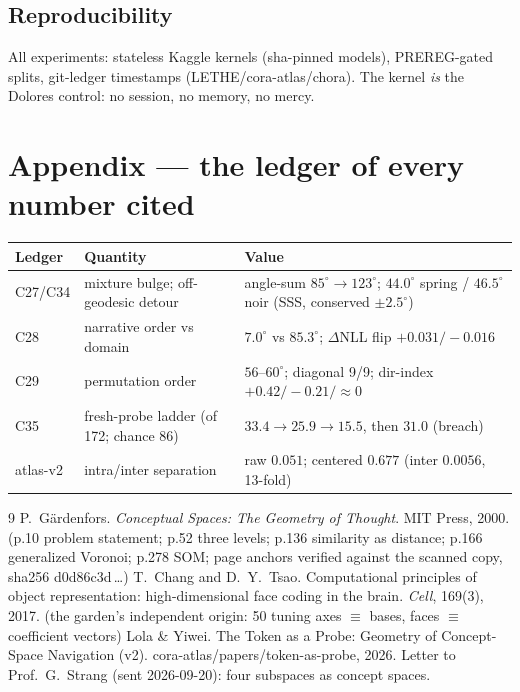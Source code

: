 \documentclass[11pt]{article}
\begin{document}
\subsection*{Reproducibility}
All experiments: stateless Kaggle kernels (sha-pinned models), PREREG-gated
splits, git-ledger timestamps (LETHE/cora-atlas/chora). The kernel \emph{is} the
Dolores control: no session, no memory, no mercy.

\section*{Appendix --- the ledger of every number cited}
\begin{tabular}{llp{7.2cm}}
\toprule
Ledger & Quantity & Value\\
\midrule
C27/C34 & mixture bulge; off-geodesic detour & angle-sum $85^\circ\!\to\!123^\circ$; $44.0^\circ$ spring / $46.5^\circ$ noir (SSS, conserved $\pm2.5^\circ$)\\
C28 & narrative order vs domain & $7.0^\circ$ vs $85.3^\circ$; $\Delta$NLL flip $+0.031/-0.016$\\
C29 & permutation order & $56$--$60^\circ$; diagonal 9/9; dir-index $+0.42/-0.21/\approx0$\\
C35 & fresh-probe ladder (of 172; chance 86) & $33.4\to25.9\to15.5$, then $31.0$ (breach)\\
atlas-v2 & intra/inter separation & raw $0.051$; centered $0.677$ (inter $0.0056$, 13-fold)\\
\bottomrule
\end{tabular}


\begin{thebibliography}{9}
 P.~G\"ardenfors. \emph{Conceptual Spaces: The Geometry of Thought}. MIT Press, 2000. (p.10 problem statement; p.52 three levels; p.136 similarity as distance; p.166 generalized Voronoi; p.278 SOM; page anchors verified against the scanned copy, sha256 d0d86c3d\,\dots)
 T.~Chang and D.~Y.~Tsao. Computational principles of object
representation: high-dimensional face coding in the brain. \emph{Cell}, 169(3),
2017. (the garden's independent origin: 50 tuning axes $\equiv$ bases, faces
$\equiv$ coefficient vectors)
 Lola \& Yiwei. The Token as a Probe: Geometry of Concept-Space Navigation (v2). cora-atlas/papers/token-as-probe, 2026.
 Letter to Prof.\ G.\ Strang (sent 2026-09-20): four subspaces as concept spaces.
\end{thebibliography}
\end{document}
